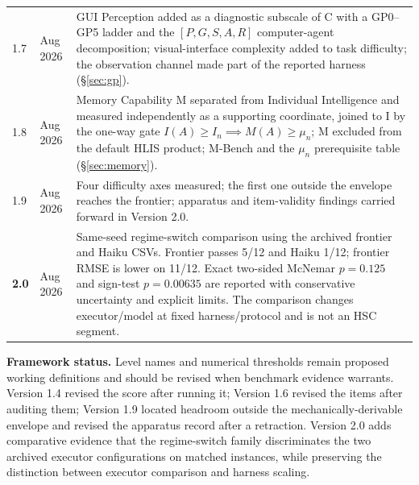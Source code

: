 \documentclass[11pt]{article}
\theoremstyle{definition}
\begin{document}
\begin{table}[h]
\begin{tabularx}{\textwidth}{@{}llY@{}}
1.7 & Aug 2026 & GUI Perception added as a diagnostic subscale of C with a GP0--GP5 ladder and the $[P,G,S,A,R]$ computer-agent decomposition; visual-interface complexity added to task difficulty; the observation channel made part of the reported harness (\S\ref{sec:gp}). \\
1.8 & Aug 2026 & Memory Capability M separated from Individual Intelligence and measured independently as a supporting coordinate, joined to I by the one-way gate $I(A) \ge I_n \implies M(A) \ge \mu_n$; M excluded from the default HLIS product; M-Bench and the $\mu_n$ prerequisite table (\S\ref{sec:memory}). \\
1.9 & Aug 2026 & Four difficulty axes measured; the first one outside the envelope reaches the frontier; apparatus and item-validity findings carried forward in Version 2.0. \\
\textbf{2.0} & Aug 2026 & Same-seed regime-switch comparison using the archived frontier and Haiku CSVs. Frontier passes 5/12 and Haiku 1/12; frontier RMSE is lower on 11/12. Exact two-sided McNemar $p=0.125$ and sign-test $p=0.00635$ are reported with conservative uncertainty and explicit limits. The comparison changes executor/model at fixed harness/protocol and is not an HSC segment. \\
\bottomrule
\end{tabularx}
\end{table}

\vspace{1em}
\noindent\textbf{Framework status.} Level names and numerical thresholds remain proposed working definitions and should be revised when benchmark evidence warrants. Version 1.4 revised the score after running it; Version 1.6 revised the items after auditing them; Version 1.9 located headroom outside the mechanically-derivable envelope and revised the apparatus record after a retraction. Version 2.0 adds comparative evidence that the regime-switch family discriminates the two archived executor configurations on matched instances, while preserving the distinction between executor comparison and harness scaling.
\end{document}
